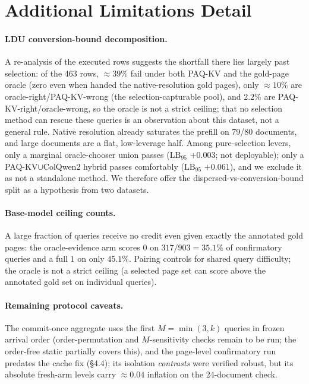 \documentclass[letterpaper]{article} %
\newcommand{\paqc}{\textsc{PAQ-KV}}
\newcommand{\lb}{\mathrm{LB}_{95}}
\begin{document}
\section{Additional Limitations Detail}\label{app:limitations-detail}
\paragraph{LDU conversion-bound decomposition.} A re-analysis of the executed rows suggests the shortfall there lies largely past selection: of the 463 rows, ${\approx}39\%$ fail under both \paqc{} and the gold-page oracle (zero even when handed the native-resolution gold pages), only ${\approx}10\%$ are oracle-right/\paqc{}-wrong (the selection-capturable pool), and $2.2\%$ are \paqc{}-right/oracle-wrong, so the oracle is not a strict ceiling; that no selection method can rescue these queries is an observation about this dataset, not a general rule. Native resolution already saturates the prefill on 79/80 documents, and large documents are a flat, low-leverage half. Among pure-selection levers, only a marginal oracle-chooser union passes ($\lb$ $+0.003$; not deployable); only a \paqc{}${\cup}$ColQwen2 hybrid passes comfortably ($\lb$ $+0.061$), and we exclude it as not a standalone method. We therefore offer the dispersed-vs-conversion-bound split as a hypothesis from two datasets.

\paragraph{Base-model ceiling counts.} A large fraction of queries receive no credit even given exactly the annotated gold pages: the oracle-evidence arm scores $0$ on $317/903=35.1\%$ of confirmatory queries and a full $1$ on only $45.1\%$. Pairing controls for shared query difficulty; the oracle is not a strict ceiling (a selected page set can score above the annotated gold set on individual queries).

\paragraph{Remaining protocol caveats.} The commit-once aggregate uses the first $M{=}\min(3,k)$ queries in frozen arrival order (order-permutation and $M$-sensitivity checks remain to be run; the order-free static partially covers this), and the page-level confirmatory run predates the cache fix (\S4.4); its isolation \emph{contrasts} were verified robust, but its absolute fresh-arm levels carry ${\approx}0.04$ inflation on the 24-document check.


\end{document}
